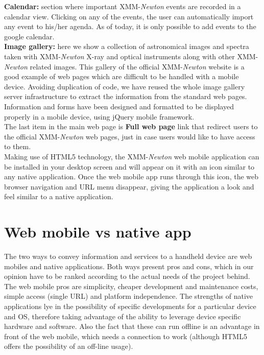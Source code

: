 \documentclass[11pt,twoside]{article}
\newcommand{\xmm}{{XMM-{\em Newton} }}
\begin{document}
{\bf Calendar:} section where important \xmm events are recorded in a
calendar view. Clicking on any of the events, the user can
automatically import any event to his/her agenda. As of today, it is
only possible to add events to the google calendar. \\

{\bf Image gallery:} here we show a collection of astronomical images
and spectra taken with \xmm X-ray and optical instruments along with
other \xmm related images. This gallery of the official \xmm
website is a good example of web pages which are difficult to be
handled with a mobile device. Avoiding duplication of code, we have
reused the whole image gallery server infrastructure to extract the
information from the standard web pages.  Information and forms have
been designed and formatted to be displayed properly in a mobile
device, using jQuery mobile framework.\\

The last item in the main web page is {\bf Full web page} link that
redirect users to the official \xmm web pages, just in case users would
like to have access to them. \\

Making use of HTML5 technology, the \xmm web mobile application can be
installed in your desktop screen and will appear on it with an icon
similar to any native application. Once the web mobile app runs
through this icon, the web browser navigation and URL menu disappear,
giving the application a look and feel similar to a native
application.

\section{Web mobile vs native app}

The two ways to convey information and services to a handheld device
are web mobiles and native applications. Both ways present pros and
cons, which in our opinion have to be ranked according to the actual
needs of the project behind. The web mobile pros are simplicity,
cheaper development and maintenance costs, simple access (single URL)
and platform independence. The strengths of native applications lye in
the possibility of specific developments for a particular device and
OS, therefore taking advantage of the ability to leverage device
specific hardware and software. Also the fact that these can run
offline is an advantage in front of the web mobile, which needs a
connection to work (although HTML5 offers the possibility of an
off-line usage).\\
\end{document}
